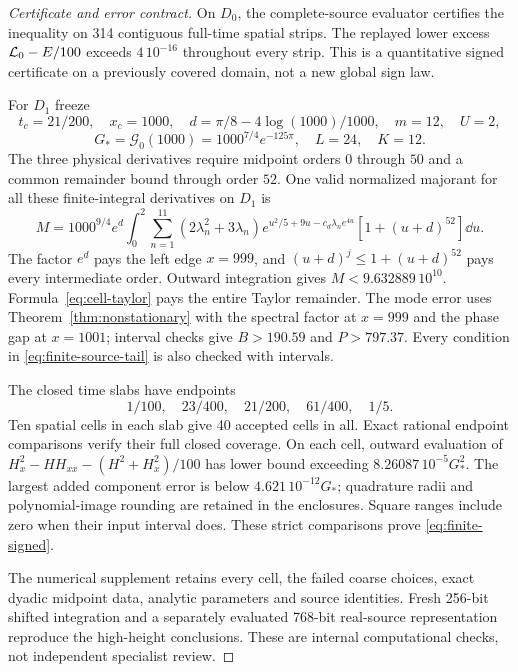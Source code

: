 \begin{proof}[Certificate and error contract]
On $D_0$, the complete-source evaluator certifies the inequality on
314 contiguous full-time spatial strips. The replayed lower excess
$\mathcal L_0-E/100$ exceeds $4\,10^{-16}$ throughout every strip.
This is a quantitative signed certificate on a previously covered
domain, not a new global sign law.

For $D_1$ freeze
\[
 t_c=21/200,\quad x_c=1000,\quad d=\pi/8-4\log(1000)/1000,
 \quad m=12,\quad U=2,
\]
\[
 G_*=\mathcal G_0(1000)=1000^{7/4}e^{-125\pi},\quad L=24,\quad K=12.
\]
The three physical derivatives require midpoint orders $0$ through $50$
and a common remainder bound through order $52$. One valid normalized
majorant for all these finite-integral derivatives on $D_1$ is
\begin{equation}\label{eq:finite-majorant}
 M=1000^{9/4}e^d\int_0^2
 \sum_{n=1}^{11}(2\lambda_n^2+3\lambda_n)
 e^{u^2/5+9u-c_d\lambda_ne^{4u}}[1+(u+d)^{52}]\dd u.
\end{equation}
The factor $e^d$ pays the left edge $x=999$, and
$(u+d)^j\le1+(u+d)^{52}$ pays every intermediate order.
Outward integration gives $M<9.632889\,10^{10}$.
Formula~\eqref{eq:cell-taylor} pays the entire Taylor remainder.
The mode error uses Theorem~\ref{thm:nonstationary} with the spectral
factor at $x=999$ and the phase gap at $x=1001$; interval checks give
$B>190.59$ and $P>797.37$. Every condition in
\eqref{eq:finite-source-tail} is also checked with intervals.

The closed time slabs have endpoints
\[
 1/100,\quad23/400,\quad21/200,\quad61/400,\quad1/5.
\]
Ten spatial cells in each slab give 40 accepted cells in all.
Exact rational endpoint comparisons verify their full closed coverage.
On each cell, outward evaluation of
$H_x^2-HH_{xx}-(H^2+H_x^2)/100$ has lower bound exceeding
$8.26087\,10^{-5}G_*^2$. The largest added component error is
below $4.621\,10^{-12}G_*$; quadrature radii and polynomial-image
rounding are retained in the enclosures. Square ranges include zero
when their input interval does. These strict comparisons prove
\eqref{eq:finite-signed}.

The numerical supplement retains every cell, the failed coarse choices,
exact dyadic midpoint data, analytic parameters and source identities.
Fresh 256-bit shifted integration and a separately evaluated 768-bit
real-source representation reproduce the high-height conclusions.
These are internal computational checks, not independent specialist review.
\end{proof}

